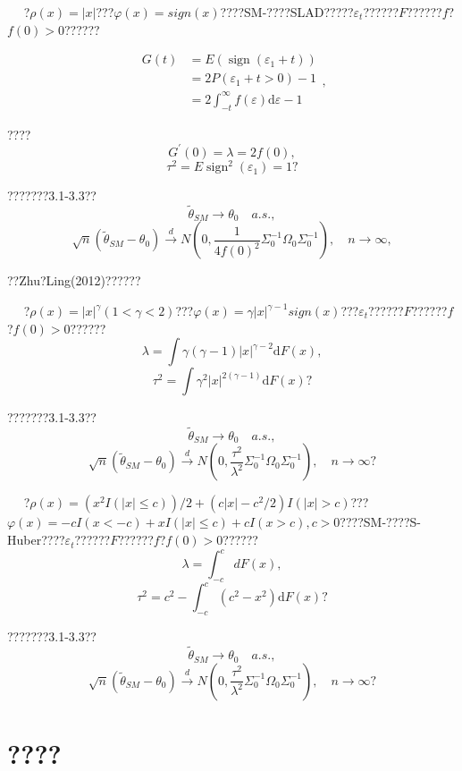 \documentclass[a4paper,12pt,openany,oneside,utf-8]{ctexbook}
\newcommand{\xiaosihao}{\fontsize{12pt}{\baselineskip}\selectfont}
\begin{document}
	\noindent{\xiaosihao\heiti ?~3.1}~~ ?$\rho(x)=|x|$???$\varphi(x)=sign(x)$????SM-????SLAD?????$\varepsilon_t$??????$F$??????$f$?$f(0) > 0$??????
	
	$$\begin{aligned} G(t) &=E\left(\operatorname{sign}\left(\varepsilon_{1}+t\right)\right) \\&=2 P\left(\varepsilon_{1}+t>0\right)-1 \\&=2 \int_{-t}^{\infty} f(\varepsilon) \mathrm{d}\varepsilon-1\end{aligned},$$
	
	\noindent ????
	$$G^{\prime}(0)=\lambda=2f(0),$$
	$$\tau^{2}=E \operatorname{sign}^{2}\left(\varepsilon_{1}\right)=1\mbox{?}$$
	
	\noindent ???????3.1-3.3??
	$$\widetilde{\theta}_{SM}\to\theta_0\quad a.s. ,$$
	$$\sqrt{n}(\widetilde{\theta}_{SM}-\theta_0)\stackrel{d}{\rightarrow}N\left(0,\frac{1}{4f(0)^2}\Sigma_0^{-1}\Omega_0\Sigma_0^{-1}\right),\quad n\to\infty,$$
	
	\noindent ??Zhu?Ling(2012)??????
	
	\noindent{\xiaosihao\heiti ?~3.2}~~ ?$\rho(x)=|x|^\gamma(1<\gamma<2)$???$\varphi(x)=\gamma|x|^{\gamma-1}sign(x)$???$\varepsilon_t$??????$F$??????$f$?$f(0) > 0$??????
	$$\lambda=\int \gamma(\gamma-1)|x|^{\gamma-2} \mathrm{d} F(x), $$
	$$\tau^{2}=\int \gamma^{2}|x|^{2(\gamma-1)} \mathrm{d}F(x)\mbox{?}$$
	
	\noindent ???????3.1-3.3??
	$$\widetilde{\theta}_{SM}\to\theta_0\quad a.s. ,$$
	$$\sqrt{n}(\widetilde{\theta}_{SM}-\theta_0)\stackrel{d}{\rightarrow}N\left(0,\frac{\tau^2}{\lambda^2}\Sigma_0^{-1}\Omega_0\Sigma_0^{-1}\right),\quad n\to\infty\mbox{?}$$
	
	\noindent{\xiaosihao\heiti ?~3.3}~~ ?$\rho(x)=\left(x^{2} I(|x| \leq c)\right) / 2+\left(c|x|-c^{2} / 2\right) I(|x|>c)$???$\varphi(x)=-c I(x<-c)+x I(|x| \leq c)+c I(x>c), c>0$????SM-????S-Huber????$\varepsilon_t$??????$F$??????$f$?$f(0) > 0$??????
	$$\lambda=\int_{-c}^{c} d F(x),$$
	$$\tau^{2}=c^{2}-\int_{-c}^{c}\left(c^{2}-x^{2}\right)\mathrm{d}F(x)\mbox{?}$$
	
	\noindent ???????3.1-3.3??
	$$\widetilde{\theta}_{SM}\to\theta_0\quad a.s. ,$$
	$$\sqrt{n}(\widetilde{\theta}_{SM}-\theta_0)\stackrel{d}{\rightarrow}N\left(0,\frac{\tau^2}{\lambda^2}\Sigma_0^{-1}\Omega_0\Sigma_0^{-1}\right),\quad n\to\infty\mbox{?}$$
	
	\section{????}
	
\end{document}
